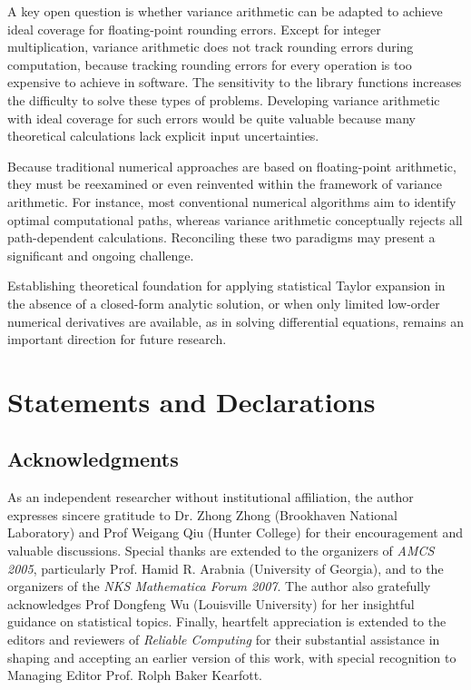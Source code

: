\documentclass[twoside]{article}
\numberwithin{equation}{section}
\newcommand{\Verbose}{}
\begin{document}
A key open question is whether variance arithmetic can be adapted to achieve ideal coverage for floating-point rounding errors.
Except for integer multiplication, variance arithmetic does not track rounding errors during computation, because tracking rounding errors for every operation is too expensive to achieve in software.
The sensitivity to the library functions increases the difficulty to solve these types of problems.
Developing variance arithmetic with ideal coverage for such errors would be quite valuable because many theoretical calculations lack explicit input uncertainties.

Because traditional numerical approaches are based on floating-point arithmetic, they must be reexamined or even reinvented within the framework of variance arithmetic.
For instance, most conventional numerical algorithms aim to identify optimal computational paths, whereas variance arithmetic conceptually rejects all path-dependent calculations.
Reconciling these two paradigms may present a significant and ongoing challenge.

Establishing theoretical foundation for applying statistical Taylor expansion in the absence of a closed-form analytic solution, or when only limited low-order numerical derivatives are available, as in solving differential equations, remains an important  direction for future research.


\ifdefined\Verbose
\clearpage
\fi
\section{Statements and Declarations}

\subsection{Acknowledgments}

As an independent researcher without institutional affiliation, the author expresses sincere gratitude to Dr. Zhong Zhong (Brookhaven National Laboratory) and Prof Weigang Qiu (Hunter College) for their encouragement and valuable discussions.
Special thanks are extended to the organizers of \emph{AMCS 2005}, particularly Prof. Hamid R. Arabnia (University of Georgia), and to the organizers of the \emph{NKS Mathematica Forum 2007}. 
The author also gratefully acknowledges Prof Dongfeng Wu (Louisville University) for her insightful guidance on statistical topics.
Finally, heartfelt appreciation is extended to the editors and reviewers of \emph{Reliable Computing} for their substantial assistance in shaping and accepting an earlier version of this work, with special recognition to Managing Editor Prof. Rolph Baker Kearfott.
\end{document}
